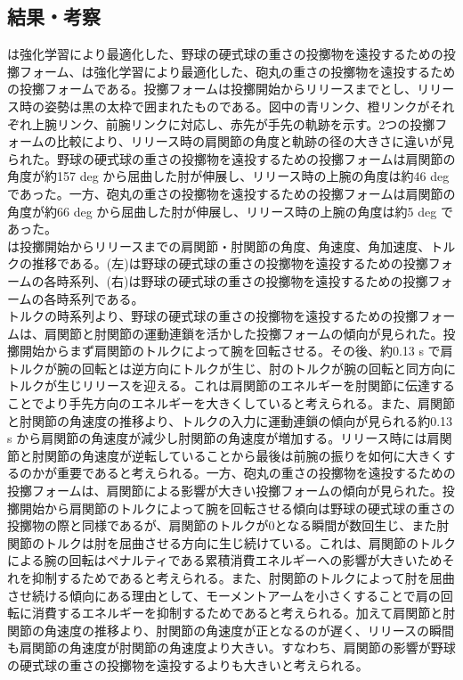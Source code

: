 \subsection{結果・考察}
は強化学習により最適化した、野球の硬式球の重さの投擲物を遠投するための投擲フォーム、は強化学習により最適化した、砲丸の重さの投擲物を遠投するための投擲フォームである。投擲フォームは投擲開始からリリースまでとし、リリース時の姿勢は黒の太枠で囲まれたものである。図中の青リンク、橙リンクがそれぞれ上腕リンク、前腕リンクに対応し、赤先が手先の軌跡を示す。2つの投擲フォームの比較により、リリース時の肩関節の角度と軌跡の径の大きさに違いが見られた。野球の硬式球の重さの投擲物を遠投するための投擲フォームは肩関節の角度が約157 deg から屈曲した肘が伸展し、リリース時の上腕の角度は約46 deg であった。一方、砲丸の重さの投擲物を遠投するための投擲フォームは肩関節の角度が約66 deg から屈曲した肘が伸展し、リリース時の上腕の角度は約5 deg であった。\\
は投擲開始からリリースまでの肩関節・肘関節の角度、角速度、角加速度、トルクの推移である。(左)は野球の硬式球の重さの投擲物を遠投するための投擲フォームの各時系列、(右)は野球の硬式球の重さの投擲物を遠投するための投擲フォームの各時系列である。\\
トルクの時系列より、野球の硬式球の重さの投擲物を遠投するための投擲フォームは、肩関節と肘関節の運動連鎖を活かした投擲フォームの傾向が見られた。投擲開始からまず肩関節のトルクによって腕を回転させる。その後、約0.13 s で肩トルクが腕の回転とは逆方向にトルクが生じ、肘のトルクが腕の回転と同方向にトルクが生じリリースを迎える。これは肩関節のエネルギーを肘関節に伝達することでより手先方向のエネルギーを大きくしていると考えられる。また、肩関節と肘関節の角速度の推移より、トルクの入力に運動連鎖の傾向が見られる約0.13 s から肩関節の角速度が減少し肘関節の角速度が増加する。リリース時には肩関節と肘関節の角速度が逆転していることから最後は前腕の振りを如何に大きくするのかが重要であると考えられる。一方、砲丸の重さの投擲物を遠投するための投擲フォームは、肩関節による影響が大きい投擲フォームの傾向が見られた。投擲開始から肩関節のトルクによって腕を回転させる傾向は野球の硬式球の重さの投擲物の際と同様であるが、肩関節のトルクが0となる瞬間が数回生じ、また肘関節のトルクは肘を屈曲させる方向に生じ続けている。これは、肩関節のトルクによる腕の回転はペナルティである累積消費エネルギーへの影響が大きいためそれを抑制するためであると考えられる。また、肘関節のトルクによって肘を屈曲させ続ける傾向にある理由として、モーメントアームを小さくすることで肩の回転に消費するエネルギーを抑制するためであると考えられる。加えて肩関節と肘関節の角速度の推移より、肘関節の角速度が正となるのが遅く、リリースの瞬間も肩関節の角速度が肘関節の角速度より大きい。すなわち、肩関節の影響が野球の硬式球の重さの投擲物を遠投するよりも大きいと考えられる。



